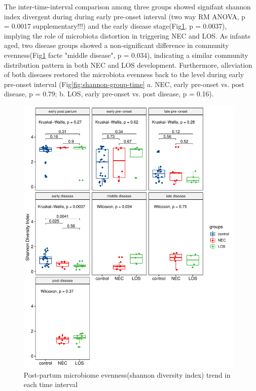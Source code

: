 \documentclass[fleqn,10pt,lineno]{wlpeerj} %
\begin{document}
    \noindent
    The inter-time-interval comparison among three groups showed signifant shannon index divergent during during early pre-onset interval (two way RM ANOVA, p = 0.0017 supplementary!!!) and the early disease stage(Fig\ref{fig:shannon-time-groups}, p = 0.0037), implying the role of microbiota distortion in triggering NEC and LOS. As infants aged, two disease groups showed a non-significant difference in community evenness(Fig\ref{fig:shannon-time-groups} facte "middle disease", p = 0.034), indicating a similar community distribution pattern in both NEC and LOS development. Furthermore, alleviation of both diseases restored the microbiota evenness back to the level during early pre-onset interval (Fig\ref{fig:shannon-group-time} a. NEC, early pre-onset vs. post disease, p = 0.79; b. LOS, early pre-onset vs. post disease, p = 0.16).
    \begin{figure}[ht]\centering
      \includegraphics[width=\linewidth]{figure/shannon-time-groups.pdf}
      \caption{Post-partum microbiome evenness(shannon diversity index) trend in each time interval}
      \label{fig:shannon-time-groups}
    \end{figure}
\end{document}
